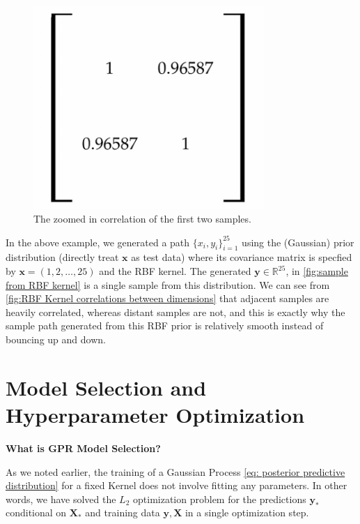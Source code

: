\documentclass[11pt]{article}
\theoremstyle{plain} %
\theoremstyle{remark}
\begin{document}
\begin{figure}[!htp]
\begin{minipage}{0.33\textwidth}
    \label{fig:RBF Kernel correlations between dimensions}
  \end{minipage}
  \begin{minipage}{0.33\textwidth}
    \centering
    \includegraphics[width=0.78\textwidth]{images/corr.png}
    \caption{The zoomed in correlation of the first two samples.}
    \label{fig:RBF Kernel zoomed in correlation of the first two samples}
  \end{minipage}
\end{figure}

In the above example, we generated a path $\{x_i, y_i\}_{i=1}^{25}$ using the
(Gaussian) prior distribution (directly treat $\mathbf{x}$ as test data) where
its covariance matrix is specfied by \(\mathbf{x} = (1, 2, \ldots, 25)\) and the
RBF kernel. The generated \(\mathbf{y}\in\mathbb{R}^{25}\), in \cref{fig:sample
from RBF kernel} is a single sample from this distribution. We can see from
\cref{fig:RBF Kernel correlations between dimensions} that adjacent samples are
heavily correlated, whereas distant samples are not, and this is exactly why the
sample path generated from this RBF prior is relatively smooth instead of bouncing up
and down.

\section{Model Selection and Hyperparameter Optimization}

\textbf{What is GPR Model Selection?}

As we noted earlier, the training of a Gaussian Process \cref{eq: posterior predictive distribution} for a fixed Kernel
does not involve fitting any parameters. In other words, we have solved the
$L_{2}$ optimization problem for the predictions $\mathbf{y}_{*}$ conditional on
$\mathbf{X}_{*}$ and training data $\mathbf{y}, \mathbf{X}$ in a single
optimization step.
\end{document}
